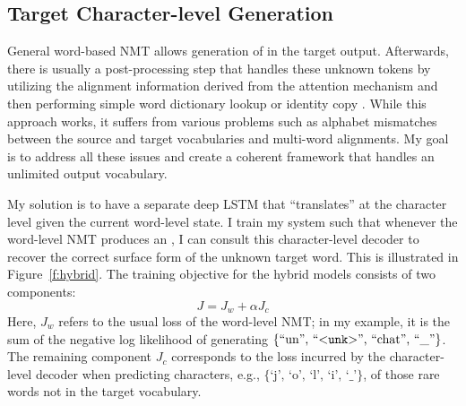 \subsection{Target Character-level Generation}
\label{subsec:tgt}
General word-based NMT allows generation of \unk{} in the target output.
Afterwards, there is usually a post-processing step that handles
these unknown tokens by utilizing the
alignment information derived from the attention mechanism and then performing
simple word dictionary lookup or identity copy \cite{luong15attn,jean15}. 
While this approach works, it suffers from various problems such as alphabet
mismatches between the source and target vocabularies and multi-word
alignments.
My goal is to address all
these issues and create a
coherent framework that handles an unlimited output vocabulary.

My solution is to have a separate deep LSTM that ``translates'' at the
character level given the current word-level state. I train my system such
that whenever the word-level NMT
produces an \unk{}, I can consult this character-level decoder to recover the correct surface form of the
unknown target word. This is illustrated in Figure~\ref{f:hybrid}.
The training objective for the hybrid models consists of two components:
\begin{equation}
J = J_{w} + \alpha J_{c}
\label{e:char_obj}
\end{equation}
Here, $J_{w}$ refers to the usual loss of the word-level NMT; in
my example, it is the sum of the negative log likelihood of
generating $\{\mbox{``un'', ``$<$\texttt{unk}$>${}'', ``chat'', ``\_''}\}$. The remaining component $J_c$
corresponds to the loss incurred by the character-level 
decoder when predicting characters, e.g., $\{\mbox{`j', `o', `l', `i',
`\_'}\}$, of those rare words not in the
target vocabulary. 


